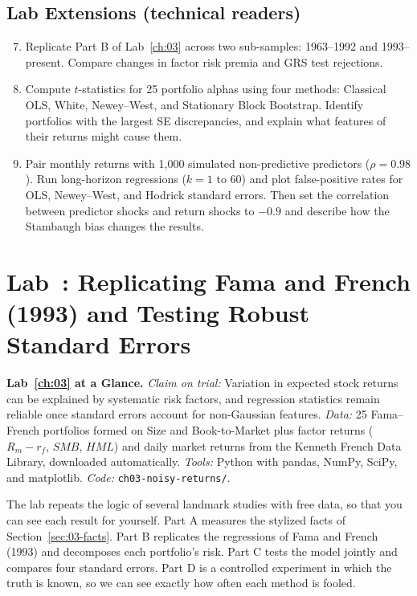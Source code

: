 \subsection*{Lab Extensions (technical readers)}
\begin{enumerate}
  \setcounter{enumi}{6}
  \item Replicate Part B of Lab~\ref{ch:03} across two sub-samples: 1963--1992 and 1993--present. Compare changes in factor risk premia and GRS test rejections.
  \item Compute $t$-statistics for 25 portfolio alphas using four methods: Classical OLS, White, Newey--West, and Stationary Block Bootstrap. Identify portfolios with the largest SE discrepancies, and explain what features of their returns might cause them.
  \item Pair monthly returns with 1,000 simulated non-predictive predictors ($\rho = 0.98$). Run long-horizon regressions ($k=1$ to $60$) and plot false-positive rates for OLS, Newey--West, and Hodrick standard errors. Then set the correlation between predictor shocks and return shocks to $-0.9$ and describe how the Stambaugh bias changes the results.
\end{enumerate}

\section{Lab~\thechapter: Replicating Fama and French (1993) and Testing Robust Standard Errors}
\label{sec:03-lab}

\begin{callout}
\noindent \textbf{Lab~\ref{ch:03} at a Glance.} \emph{Claim on trial:} Variation in expected stock returns can be explained by systematic risk factors, and regression statistics remain reliable once standard errors account for non-Gaussian features. \emph{Data:} 25 Fama--French portfolios formed on Size and Book-to-Market plus factor returns ($R_m-r_f$, $SMB$, $HML$) and daily market returns from the Kenneth French Data Library, downloaded automatically. \emph{Tools:} Python with pandas, NumPy, SciPy, and matplotlib. \emph{Code:} \texttt{ch03-noisy-returns/}.
\end{callout}

The lab repeats the logic of several landmark studies with free data, so that you can see each result for yourself. Part A measures the stylized facts of Section~\ref{sec:03-facts}. Part B replicates the regressions of Fama and French (1993) and decomposes each portfolio's risk. Part C tests the model jointly and compares four standard errors. Part D is a controlled experiment in which the truth is known, so we can see exactly how often each method is fooled.

